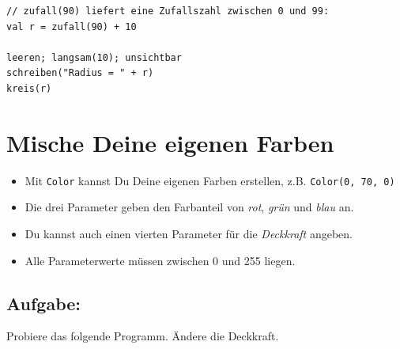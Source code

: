   

\begin{lstlisting}[basicstyle={\ttfamily\fontsize{20}{24}\selectfont},numbers=none]
// zufall(90) liefert eine Zufallszahl zwischen 0 und 99:
val r = zufall(90) + 10   

leeren; langsam(10); unsichtbar
schreiben("Radius = " + r)
kreis(r)
\end{lstlisting}
        
\chapter{Mische Deine eigenen Farben}

\begin{itemize}

\item {Mit \lstinline{Color} kannst Du Deine eigenen Farben erstellen, z.B. \lstinline{Color(0, 70, 0)}}
\item {Die drei Parameter geben den Farbanteil von {\it rot}, {\it grün} und {\it blau} an.}
\item {Du kannst auch einen vierten Parameter für die {\it Deckkraft} angeben.}
\item {Alle Parameterwerte müssen zwischen 0 und 255 liegen.}

\end{itemize}


\section*{\color{BrickRed}Aufgabe:}
Probiere das folgende Programm. Ändere die Deckkraft.

